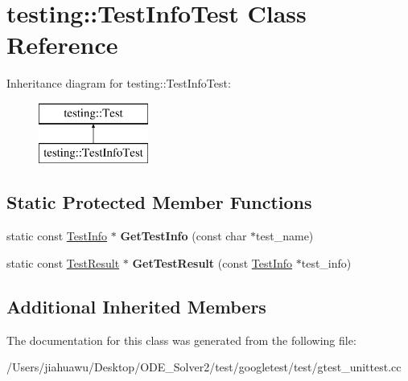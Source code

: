 \hypertarget{classtesting_1_1_test_info_test}{}\section{testing\+:\+:Test\+Info\+Test Class Reference}
\label{classtesting_1_1_test_info_test}
Inheritance diagram for testing\+:\+:Test\+Info\+Test\+:\begin{figure}[H]
\begin{center}
\leavevmode
\includegraphics[height=2.000000cm]{classtesting_1_1_test_info_test}
\end{center}
\end{figure}
\subsection*{Static Protected Member Functions}
\begin{DoxyCompactItemize}
\item 
\mbox{\label{classtesting_1_1_test_info_test_a4140c1302bf53c7f1375a23923624f04}} 
static const \mbox{\hyperlink{classtesting_1_1_test_info}{Test\+Info}} $\ast$ {\bfseries Get\+Test\+Info} (const char $\ast$test\+\_\+name)
\item 
\mbox{\label{classtesting_1_1_test_info_test_a154b3679b1aa00ad037ce46eb60d18c3}} 
static const \mbox{\hyperlink{classtesting_1_1_test_result}{Test\+Result}} $\ast$ {\bfseries Get\+Test\+Result} (const \mbox{\hyperlink{classtesting_1_1_test_info}{Test\+Info}} $\ast$test\+\_\+info)
\end{DoxyCompactItemize}
\subsection*{Additional Inherited Members}


The documentation for this class was generated from the following file\+:\begin{DoxyCompactItemize}
\item 
/\+Users/jiahuawu/\+Desktop/\+O\+D\+E\+\_\+\+Solver2/test/googletest/test/gtest\+\_\+unittest.\+cc\end{DoxyCompactItemize}
